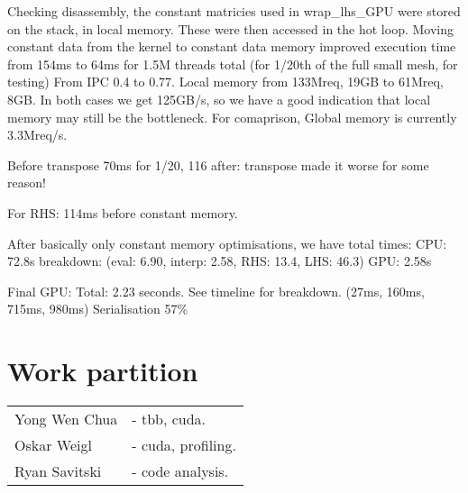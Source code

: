 \documentclass[11pt, oneside, a4paper]{article}
\begin{document}
Checking disassembly, the constant matricies used in wrap\_lhs\_GPU were stored on the stack, in local memory. These were then accessed in the hot loop.
Moving constant data from the kernel to constant data memory improved execution time from 154ms to 64ms for 1.5M threads total (for 1/20th of the full small mesh, for testing)
From IPC 0.4 to 0.77.
Local memory from 133Mreq, 19GB to 61Mreq, 8GB.
In both cases we get 125GB/s, so we have a good indication that local memory may still be the bottleneck.
For comaprison, Global memory is currently 3.3Mreq/s.

Before transpose 70ms for 1/20, 116 after: transpose made it worse for some reason!

For RHS: 114ms before constant memory.

After basically only constant memory optimisations, we have total times:
CPU: 72.8s breakdown: (eval: 6.90, interp: 2.58, RHS: 13.4, LHS: 46.3)
GPU: 2.58s


Final GPU:
Total: 2.23 seconds. See timeline for breakdown. (27ms, 160ms, 715ms, 980ms)
Serialisation 57\%



\section{Work partition} %
\label{sec:work_partition}
\begin{tabular}{ l l  }
Yong Wen Chua & - tbb, cuda. \\
Oskar Weigl & - cuda, profiling. \\
Ryan Savitski & - code analysis. \\
\end{tabular}
\end{document}
